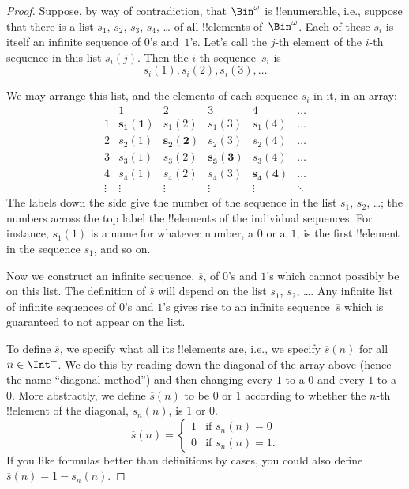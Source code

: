 \documentclass[../../../include/open-logic-section]{subfiles}
\begin{document}
\begin{proof}
Suppose, by way of contradiction, that $\Bin^\omega$ is
!!{enumerable}, i.e., suppose that there is a list $s_{1}$, $s_{2}$,
$s_{3}$, $s_{4}$, \dots{} of all !!{element}s of~$\Bin^\omega$.  Each
of these $s_i$ is itself an infinite sequence of $0$'s and~$1$'s.
Let's call the $j$-th element of the $i$-th sequence in this list
$s_i(j)$. Then the $i$-th sequence~$s_i$ is
\[
s_i(1), s_i(2), s_i(3), \dots
\]

We may arrange this list, and the elements of each sequence $s_i$ in
it, in an array:
\[
\begin{array}{c|c|c|c|c|c}
& 1 & 2 & 3 & 4 & \dots \\\hline
1 & \mathbf{s_{1}(1)} & s_{1}(2) & s_{1}(3) & s_1(4) & \dots \\\hline
2 & s_{2}(1)& \mathbf{s_{2}(2)} & s_2(3) & s_2(4) & \dots \\\hline
3 & s_{3}(1)& s_{3}(2) & \mathbf{s_3(3)} & s_3(4) & \dots \\\hline
4 & s_{4}(1)& s_{4}(2) & s_4(3) & \mathbf{s_4(4)} & \dots \\\hline
\vdots & \vdots & \vdots & \vdots & \vdots & \mathbf{\ddots}
\end{array}
\]
The labels down the side give the number of the sequence in the list
$s_1$, $s_2$, \dots; the numbers across the top label the !!{element}s
of the individual sequences. For instance, $s_{1}(1)$ is a name for
whatever number, a $0$ or a~$1$, is the first !!{element} in the
sequence $s_{1}$, and so on.

Now we construct an infinite sequence, $\overline{s}$, of $0$'s and
$1$'s which cannot possibly be on this list.  The definition of
$\overline{s}$ will depend on the list $s_1$, $s_2$, \dots.  Any
infinite list of infinite sequences of $0$'s and $1$'s gives rise to
an infinite sequence~$\overline{s}$ which is guaranteed to not appear
on the list.

To define $\overline{s}$, we specify what all its !!{element}s are,
i.e., we specify $\overline{s}(n)$ for all $n \in \Int^+$.  We do this
by reading down the diagonal of the array above (hence the name
``diagonal method'') and then changing every $1$ to a $0$ and every
$1$ to a~$0$. More abstractly, we define $\overline{s}(n)$ to be $0$
or $1$ according to whether the $n$-th !!{element} of the diagonal,
$s_n(n)$, is $1$ or $0$.
\[
\overline{s}(n) =
\begin{cases}
1 & \text{if $s_{n}(n) = 0$}\\
0 & \text{if $s_{n}(n) = 1$}.
\end{cases}
\]
If you like formulas better than definitions by cases, you could also
define $\overline{s}(n) = 1 - s_n(n)$.


\end{proof}
\end{document}
